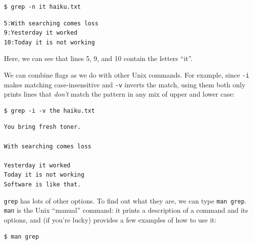 \documentclass[]{book}
\begin{document}
\begin{verbatim}
$ grep -n it haiku.txt
\end{verbatim}

\begin{verbatim}
5:With searching comes loss
9:Yesterday it worked
10:Today it is not working
\end{verbatim}

Here, we can see that lines 5, 9, and 10 contain the letters ``it''.

We can combine flags as we do with other Unix commands. For example,
since \texttt{-i} makes matching case-insensitive and \texttt{-v}
inverts the match, using them both only prints lines that \emph{don't}
match the pattern in any mix of upper and lower case:

\begin{verbatim}
$ grep -i -v the haiku.txt
\end{verbatim}

\begin{verbatim}
You bring fresh toner.

With searching comes loss

Yesterday it worked
Today it is not working
Software is like that.
\end{verbatim}

\texttt{grep} has lots of other options. To find out what they are, we
can type \texttt{man grep}. \texttt{man} is the Unix ``manual'' command:
it prints a description of a command and its options, and (if you're
lucky) provides a few examples of how to use it:

\begin{verbatim}
$ man grep
\end{verbatim}
\end{document}
